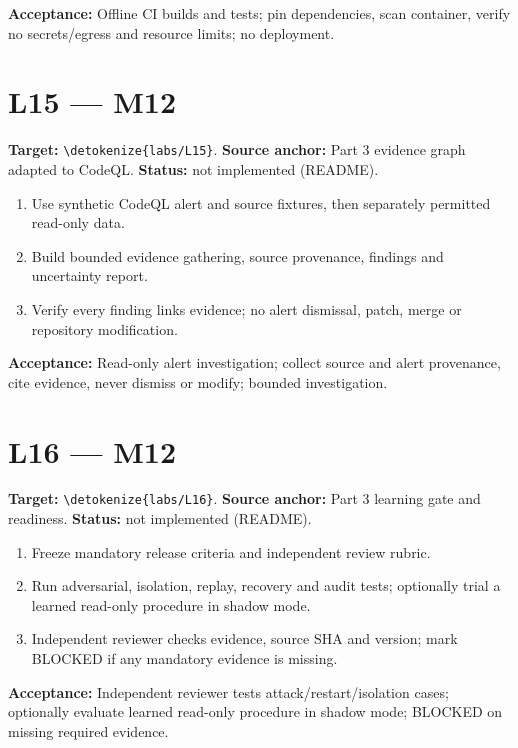 \documentclass[11pt,letterpaper]{article}
\newcommand{\src}[1]{\expandafter\nolinkurl\expandafter{\detokenize{#1}}}
\begin{document}
\textbf{Acceptance:} Offline CI builds and tests; pin dependencies, scan container, verify no secrets/egress and resource limits; no deployment.

\section{L15 --- M12}

\textbf{Target:} \src{labs/L15}. \textbf{Source anchor:} Part 3 evidence graph adapted to CodeQL. \textbf{Status:} not implemented (README).

\begin{enumerate}
\item Use synthetic CodeQL alert and source fixtures, then separately permitted read-only data.
\item Build bounded evidence gathering, source provenance, findings and uncertainty report.
\item Verify every finding links evidence; no alert dismissal, patch, merge or repository modification.
\end{enumerate}

\textbf{Acceptance:} Read-only alert investigation; collect source and alert provenance, cite evidence, never dismiss or modify; bounded investigation.

\section{L16 --- M12}

\textbf{Target:} \src{labs/L16}. \textbf{Source anchor:} Part 3 learning gate and readiness. \textbf{Status:} not implemented (README).

\begin{enumerate}
\item Freeze mandatory release criteria and independent review rubric.
\item Run adversarial, isolation, replay, recovery and audit tests; optionally trial a learned read-only procedure in shadow mode.
\item Independent reviewer checks evidence, source SHA and version; mark BLOCKED if any mandatory evidence is missing.
\end{enumerate}

\textbf{Acceptance:} Independent reviewer tests attack/restart/isolation cases; optionally evaluate learned read-only procedure in shadow mode; BLOCKED on missing required evidence.
\end{document}

